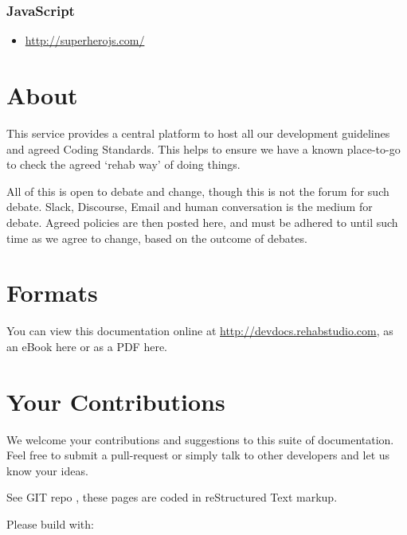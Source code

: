 \documentclass[letterpaper,10pt,english]{sphinxmanual}
\begin{document}
\subsection{JavaScript}
\label{resources:javascript}\begin{itemize}
\item {} 
\href{http://superherojs.com/}{http://superherojs.com/}

\end{itemize}


\chapter{About}
\label{index:about}
This service provides a central platform to host all our development guidelines and agreed Coding Standards.
This helps to ensure we have a known place-to-go to check the agreed `rehab way' of doing things.

All of this is open to debate and change, though this is not the forum for such debate. Slack, Discourse, Email
and human conversation is the medium for debate. Agreed policies are then posted here, and must be adhered to
until such time as we agree to change, based on the outcome of debates.


\chapter{Formats}
\label{index:formats}
You can view this documentation online at \href{http://devdocs.rehabstudio.com}{http://devdocs.rehabstudio.com}, as an eBook here or as a PDF here.


\chapter{Your Contributions}
\label{index:your-contributions}
We welcome your contributions and suggestions to this suite of documentation.  Feel free to submit a pull-request
or simply talk to other developers and let us know your ideas.

See GIT repo , these pages are coded in
reStructured Text markup.

Please build with: 



\renewcommand{\indexname}{Index}
\printindex
\end{document}
